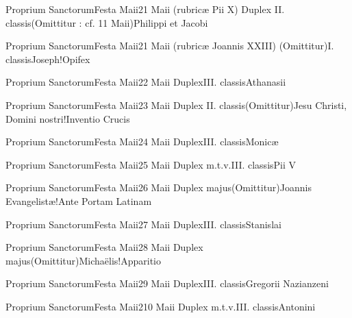 \documentclass[nocturnale-romanum.tex]{subfiles}
\begin{document}

	{Proprium Sanctorum}{Festa Maii}{2}{1 Maii (rubricæ Pii X)}
	{Duplex II. classis}{(Omittitur : cf. 11 Maii)}{Philippi et Jacobi}
	{}
	{}

	{Proprium Sanctorum}{Festa Maii}{2}{1 Maii (rubricæ Joannis XXIII)}
	{(Omittitur)}{I. classis}{Joseph!Opifex}
	{}
	{}

	{Proprium Sanctorum}{Festa Maii}{2}{2 Maii}
	{Duplex}{III. classis}{Athanasii}
	{}
	{}

	{Proprium Sanctorum}{Festa Maii}{2}{3 Maii}
	{Duplex II. classis}{(Omittitur)}{Jesu Christi, Domini nostri!Inventio Crucis}
	{}
	{}

	{Proprium Sanctorum}{Festa Maii}{2}{4 Maii}
	{Duplex}{III. classis}{Monicæ}
	{}
	{}

	{Proprium Sanctorum}{Festa Maii}{2}{5 Maii}
	{Duplex m.t.v.}{III. classis}{Pii V}
	{}
	{}

	{Proprium Sanctorum}{Festa Maii}{2}{6 Maii}
	{Duplex majus}{(Omittitur)}{Joannis Evangelistæ!Ante Portam Latinam}
	{}
	{}

	{Proprium Sanctorum}{Festa Maii}{2}{7 Maii}
	{Duplex}{III. classis}{Stanislai}
	{}
	{}

	{Proprium Sanctorum}{Festa Maii}{2}{8 Maii}
	{Duplex majus}{(Omittitur)}{Michaëlis!Apparitio}
	{}
	{}

	{Proprium Sanctorum}{Festa Maii}{2}{9 Maii}
	{Duplex}{III. classis}{Gregorii Nazianzeni}
	{}
	{}

	{Proprium Sanctorum}{Festa Maii}{2}{10 Maii}
	{Duplex m.t.v.}{III. classis}{Antonini}
	{}
	{}
\end{document}
